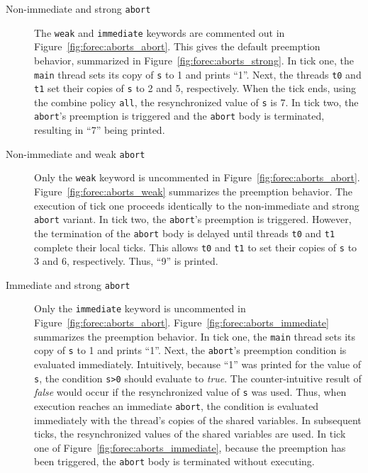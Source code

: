 \begin{description}
	\item[Non-immediate and strong \texttt{abort}] The \texttt{weak} and 
		  \texttt{immediate} keywords are commented out in 
		  Figure~\ref{fig:forec:aborts_abort}. This gives the default preemption
		  behavior, summarized in Figure~\ref{fig:forec:aborts_strong}.
		  In tick one, the
		  \texttt{main} thread sets its copy of \texttt{s} to 1 and prints
		  ``1''. Next, the threads \texttt{t0} and \texttt{t1} set their
		  copies of \texttt{s} to 2 and 5, respectively. When the tick
		  ends, using the combine policy \texttt{all}, the
		  resynchronized value of \texttt{s} is 7. In tick two, the
		  \texttt{abort}'s preemption is triggered and the \texttt{abort}
		  body is terminated, resulting in ``7'' being printed. 
	
	\item[Non-immediate and weak \texttt{abort}] Only the \texttt{weak} 
		  keyword is uncommented in Figure~\ref{fig:forec:aborts_abort}.
		  Figure~\ref{fig:forec:aborts_weak} summarizes the preemption
		  behavior. The execution of tick one proceeds identically to 
		  the non-immediate and strong \texttt{abort} variant. In tick two, 
		  the \texttt{abort}'s preemption is triggered. However, the termination
		  of the \texttt{abort} body is delayed until threads \texttt{t0} and 
		  \texttt{t1} complete their local ticks.
		  This allows \texttt{t0} and \texttt{t1} to set their copies 
		  of \texttt{s} to 3 and 6, respectively. Thus, ``9''
		  is printed.
	
	\item[Immediate and strong \texttt{abort}] Only the \texttt{immediate} 
		  keyword is uncommented in Figure~\ref{fig:forec:aborts_abort}.
		  Figure~\ref{fig:forec:aborts_immediate} summarizes the 
		  preemption behavior. In tick one, the \texttt{main} thread sets
		  its copy of \texttt{s} to 1 and prints ``1''. Next, the
		  \texttt{abort}'s preemption condition is evaluated immediately.
		  Intuitively, because ``1'' was printed for the value of 
		  \texttt{s}, the condition \texttt{s>0} should
		  evaluate to \emph{true}. The counter-intuitive result of 
		  \emph{false} would occur if the resynchronized value of \texttt{s} 
		  was used. Thus, when execution reaches an immediate
		  \texttt{abort}, the condition \expression{} is evaluated 
		  immediately with the thread's copies of the shared variables. 
		  In subsequent ticks, the resynchronized values of the shared 
		  variables are used. In tick one of Figure~\ref{fig:forec:aborts_immediate}, 
		  because the preemption has been triggered, the 
		  \texttt{abort} body is terminated without executing.
	

\end{description}
